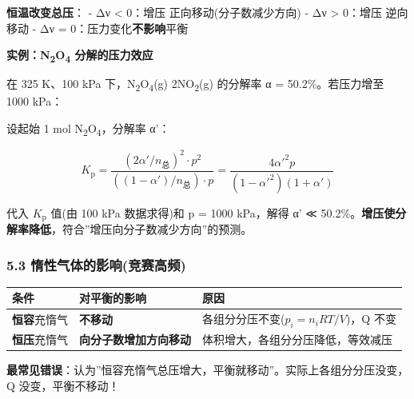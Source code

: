 \textbf{恒温改变总压}：
- Δν \textless{} 0：增压 \箭 正向移动(分子数减少方向)
- Δν \textgreater{} 0：增压 \箭 逆向移动
- Δν = 0：压力变化\textbf{不影响}平衡

\textbf{实例：N\textsubscript{2}O\textsubscript{4} 分解的压力效应}

在 325 K、100 kPa 下，N\textsubscript{2}O\textsubscript{4}(g) \衡 2NO\textsubscript{2}(g) 的分解率 α = 50.2\%。若压力增至 1000 kPa：

设起始 1 mol N\textsubscript{2}O\textsubscript{4}，分解率 α'：

\[
K_{\mathrm p} = \frac{(2\alpha'/n_{总})^2 \cdot p^2}{((1-\alpha')/n_{总}) \cdot p} = \frac{4\alpha'^2 p}{(1-\alpha'^2)(1+\alpha')}
\]

代入 \(K_{\mathrm p}\) 值(由 100 kPa 数据求得)和 p = 1000 kPa，解得 α' ≪ 50.2\%。\textbf{增压使分解率降低}，符合''增压向分子数减少方向''的预测。

\subsubsection{5.3 惰性气体的影响(竞赛高频)}\label{ux60f0ux6027ux6c14ux4f53ux7684ux5f71ux54cdux7adeux8d5bux9ad8ux9891}

{\def\LTcaptype{none} %
\begin{longtable}[]{@{}
  >{\raggedright\arraybackslash}p{}
  >{\raggedright\arraybackslash}p{}
  >{\raggedright\arraybackslash}p{}@{}}
\toprule\noalign{}
\begin{minipage}[b]{\linewidth}\raggedright
条件
\end{minipage} & \begin{minipage}[b]{\linewidth}\raggedright
对平衡的影响
\end{minipage} & \begin{minipage}[b]{\linewidth}\raggedright
原因
\end{minipage} \\
\midrule\noalign{}
\endhead
\bottomrule\noalign{}
\endlastfoot
\textbf{恒容}充惰气 & \textbf{不移动} & 各组分分压不变(\(p_i = n_iRT/V\))，Q 不变 \\
\textbf{恒压}充惰气 & \textbf{向分子数增加方向移动} & 体积增大，各组分分压降低，等效减压 \\
\end{longtable}
}

\textbf{最常见错误}：认为''恒容充惰气总压增大，平衡就移动''。实际上各组分分压没变，Q 没变，平衡不移动！

